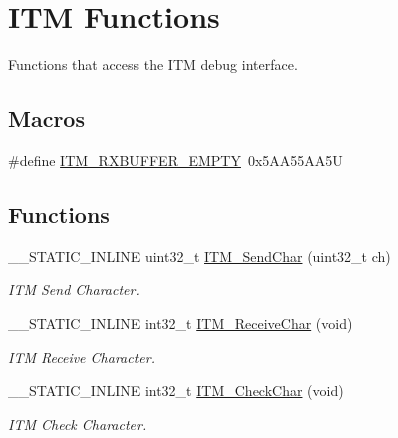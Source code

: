 \hypertarget{group__CMSIS__core__DebugFunctions}{}\section{I\+TM Functions}
\label{group__CMSIS__core__DebugFunctions}


Functions that access the I\+TM debug interface.  


\subsection*{Macros}
\begin{DoxyCompactItemize}
\item 
\#define \mbox{\hyperlink{group__CMSIS__core__DebugFunctions_gaa822cb398ee022b59e9e6c5d7bbb228a}{I\+T\+M\+\_\+\+R\+X\+B\+U\+F\+F\+E\+R\+\_\+\+E\+M\+P\+TY}}~0x5\+A\+A55\+A\+A5U
\end{DoxyCompactItemize}
\subsection*{Functions}
\begin{DoxyCompactItemize}
\item 
\+\_\+\+\_\+\+S\+T\+A\+T\+I\+C\+\_\+\+I\+N\+L\+I\+NE uint32\+\_\+t \mbox{\hyperlink{group__CMSIS__core__DebugFunctions_gac90a497bd64286b84552c2c553d3419e}{I\+T\+M\+\_\+\+Send\+Char}} (uint32\+\_\+t ch)
\begin{DoxyCompactList}\small\item\em I\+TM Send Character. \end{DoxyCompactList}\item 
\+\_\+\+\_\+\+S\+T\+A\+T\+I\+C\+\_\+\+I\+N\+L\+I\+NE int32\+\_\+t \mbox{\hyperlink{group__CMSIS__core__DebugFunctions_gac3ee2c30a1ac4ed34c8a866a17decd53}{I\+T\+M\+\_\+\+Receive\+Char}} (void)
\begin{DoxyCompactList}\small\item\em I\+TM Receive Character. \end{DoxyCompactList}\item 
\+\_\+\+\_\+\+S\+T\+A\+T\+I\+C\+\_\+\+I\+N\+L\+I\+NE int32\+\_\+t \mbox{\hyperlink{group__CMSIS__core__DebugFunctions_gae61ce9ca5917735325cd93b0fb21dd29}{I\+T\+M\+\_\+\+Check\+Char}} (void)
\begin{DoxyCompactList}\small\item\em I\+TM Check Character. \end{DoxyCompactList}\end{DoxyCompactItemize}
